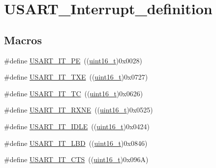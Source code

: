 \hypertarget{group___u_s_a_r_t___interrupt__definition}{}\section{U\+S\+A\+R\+T\+\_\+\+Interrupt\+\_\+definition}
\label{group___u_s_a_r_t___interrupt__definition}
\subsection*{Macros}
\begin{DoxyCompactItemize}
\item 
\#define \hyperlink{group___u_s_a_r_t___interrupt__definition_gae607c28a462c224c575b7541dc4f7067}{U\+S\+A\+R\+T\+\_\+\+I\+T\+\_\+\+PE}~((\hyperlink{_p_e___types_8h_a1f1825b69244eb3ad2c7165ddc99c956}{uint16\+\_\+t})0x0028)
\item 
\#define \hyperlink{group___u_s_a_r_t___interrupt__definition_gab18d0fe889204a4c34f6d5817fb5147d}{U\+S\+A\+R\+T\+\_\+\+I\+T\+\_\+\+T\+XE}~((\hyperlink{_p_e___types_8h_a1f1825b69244eb3ad2c7165ddc99c956}{uint16\+\_\+t})0x0727)
\item 
\#define \hyperlink{group___u_s_a_r_t___interrupt__definition_ga748e86162cc110513330079982821c39}{U\+S\+A\+R\+T\+\_\+\+I\+T\+\_\+\+TC}~((\hyperlink{_p_e___types_8h_a1f1825b69244eb3ad2c7165ddc99c956}{uint16\+\_\+t})0x0626)
\item 
\#define \hyperlink{group___u_s_a_r_t___interrupt__definition_gacdd49b93072655a21a63a35e6431f8ae}{U\+S\+A\+R\+T\+\_\+\+I\+T\+\_\+\+R\+X\+NE}~((\hyperlink{_p_e___types_8h_a1f1825b69244eb3ad2c7165ddc99c956}{uint16\+\_\+t})0x0525)
\item 
\#define \hyperlink{group___u_s_a_r_t___interrupt__definition_ga5d85aab24b7b2dfddb61ba2a49fa6185}{U\+S\+A\+R\+T\+\_\+\+I\+T\+\_\+\+I\+D\+LE}~((\hyperlink{_p_e___types_8h_a1f1825b69244eb3ad2c7165ddc99c956}{uint16\+\_\+t})0x0424)
\item 
\#define \hyperlink{group___u_s_a_r_t___interrupt__definition_ga063628e16cdda199b07d380421afc4a5}{U\+S\+A\+R\+T\+\_\+\+I\+T\+\_\+\+L\+BD}~((\hyperlink{_p_e___types_8h_a1f1825b69244eb3ad2c7165ddc99c956}{uint16\+\_\+t})0x0846)
\item 
\#define \hyperlink{group___u_s_a_r_t___interrupt__definition_gab49efbefaca2921e8cbe8f5146e99dbd}{U\+S\+A\+R\+T\+\_\+\+I\+T\+\_\+\+C\+TS}~((\hyperlink{_p_e___types_8h_a1f1825b69244eb3ad2c7165ddc99c956}{uint16\+\_\+t})0x096\+A)
\item 

\end{DoxyCompactItemize}
